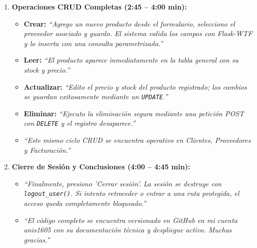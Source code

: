 \documentclass[11pt,a4paper]{article}
\begin{document}
\begin{enumerate}[leftmargin=1.2cm]
    \item \textbf{Operaciones CRUD Completas (2:45 -- 4:00 min):}
    \begin{itemize}
        \item \textbf{Crear:} \textit{``Agrego un nuevo producto desde el formulario, selecciono el proveedor asociado y guardo. El sistema valida los campos con Flask-WTF y lo inserta con una consulta parametrizada.''}
        \item \textbf{Leer:} \textit{``El producto aparece inmediatamente en la tabla general con su stock y precio.''}
        \item \textbf{Actualizar:} \textit{``Edito el precio y stock del producto registrado; los cambios se guardan exitosamente mediante un \texttt{UPDATE}.''}
        \item \textbf{Eliminar:} \textit{``Ejecuto la eliminación segura mediante una petición POST con \texttt{DELETE} y el registro desaparece.''}
        \item \textit{``Este mismo ciclo CRUD se encuentra operativo en Clientes, Proveedores y Facturación.''}
    \end{itemize}

    \item \textbf{Cierre de Sesión y Conclusiones (4:00 -- 4:45 min):}
    \begin{itemize}
        \item \textit{``Finalmente, presiono 'Cerrar sesión'. La sesión se destruye con \texttt{logout\_user()}. Si intento retroceder o entrar a una ruta protegida, el acceso queda completamente bloqueado.''}
        \item \textit{``El código completo se encuentra versionado en GitHub en mi cuenta anis1605 con su documentación técnica y despliegue activo. Muchas gracias.''}
    \end{itemize}
\end{enumerate}
\end{document}
